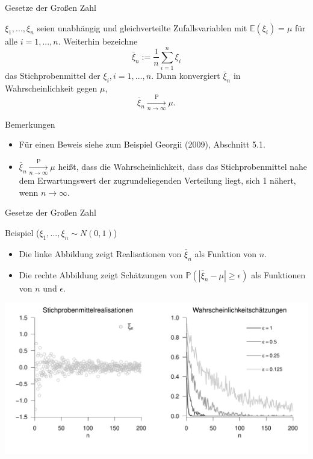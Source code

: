 \documentclass[
  8pt,
  ignorenonframetext,
]{beamer}
\providecommand{\tightlist}{%
  \setlength{\itemsep}{0pt}\setlength{\parskip}{0pt}}
\begin{document}
\begin{frame}{Gesetze der Großen Zahl}
\protect\hypertarget{gesetze-der-grouxdfen-zahl-2}{}
\small
\begin{theorem}
\justifying
\normalfont
$\xi_1,...,\xi_n$ seien unabhängig und gleichverteilte Zufallsvariablen mit
$\mathbb{E}(\xi_i) = \mu$ für alle $i = 1,...,n$. Weiterhin bezeichne
\begin{equation}
\bar{\xi}_n := \frac{1}{n}\sum_{i=1}^n \xi_i
\end{equation}
das Stichprobenmittel der $\xi_i, i = 1,...,n$. Dann konvergiert $\bar{\xi}_n$ in
Wahrscheinlichkeit gegen $\mu$,
\begin{equation}
\bar{\xi}_n \xrightarrow[n \to \infty]{\mbox{P}} \mu.
\end{equation}
\end{theorem}

\footnotesize

Bemerkungen

\begin{itemize}
\tightlist
\item
  Für einen Beweis siehe zum Beispiel Georgii (2009), Abschnitt 5.1.
\item
  \(\bar{\xi}_n \xrightarrow[n\to\infty]{\mbox{P}} \mu\) heißt, dass die
  Wahrscheinlichkeit, dass das Stichprobenmittel nahe dem Erwartungswert
  der zugrundeliegenden Verteilung liegt, sich 1 nähert, wenn
  \(n\to\infty\).
\end{itemize}
\end{frame}

\begin{frame}{Gesetze der Großen Zahl}
\protect\hypertarget{gesetze-der-grouxdfen-zahl-3}{}
\vspace{2mm}

Beispiel (\(\xi_1,...,\xi_n \sim N(0,1)\)) \vspace{1mm} \footnotesize

\begin{itemize}
\item Die linke Abbildung zeigt Realisationen von $\bar{\xi}_n$ als Funktion von $n$.
\item Die rechte Abbildung zeigt Schätzungen von $\mathbb{P}(|\bar{\xi}_n - \mu| \ge \epsilon)$
als Funktionen von $n$ und $\epsilon$.
\end{itemize}

\begin{center}\includegraphics[width=0.95\linewidth]{7_Abbildungen/wtfi_7_schwaches_gesetz} \end{center}
\end{frame}
\end{document}
